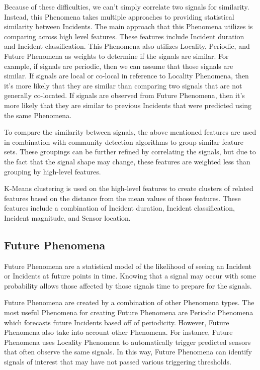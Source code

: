 Because of these difficulties, we can't simply correlate two signals for similarity. Instead, this Phenomena takes multiple approaches to providing statistical similarity between Incidents. The main approach that this Phenomena utilizes is comparing across high level features. These features include Incident duration and Incident classification. This Phenomena also utilizes Locality, Periodic, and Future Phenomena as weights to determine if the signals are similar. For example, if signals are periodic, then we can assume that those signals are similar. If signals are local or co-local in reference to Locality Phenomena, then it's more likely that they are similar than comparing two signals that are not generally co-located. If signals are observed from Future Phenomena, then it's more likely that they are similar to previous Incidents that were predicted using the same Phenomena.

To compare the similarity between signals, the above mentioned features are used in combination with community detection algorithms to group similar feature sets. These groupings can be further refined by correlating the signals, but due to the fact that the signal shape may change, these features are weighted less than grouping by high-level features.

K-Means clustering is used on the high-level features to create clusters of related features based on the distance from the mean values of those features. These features include a combination of Incident duration, Incident classification, Incident magnitude, and Sensor location.

\subsection{Future Phenomena}\label{subsec:future-phenomena}
Future Phenomena are a statistical model of the likelihood of seeing an Incident or Incidents at future points in time. Knowing that a signal may occur with some probability allows those affected by those signals time to prepare for the signals.

Future Phenomena are created by a combination of other Phenomena types. The most useful Phenomena for creating Future Phenomena are Periodic Phenomena which forecasts future Incidents based off of periodicity. However, Future Phenomena also take into account other Phenomena. For instance, Future Phenomena uses Locality Phenomena to automatically trigger predicted sensors that often observe the same signals. In this way, Future Phenomena can identify signals of interest that may have not passed various triggering thresholds.

